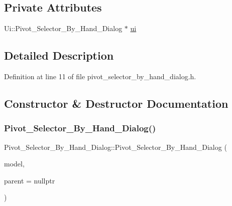 \subsection*{Private Attributes}
\begin{DoxyCompactItemize}
\item 
Ui\+::\+Pivot\+\_\+\+Selector\+\_\+\+By\+\_\+\+Hand\+\_\+\+Dialog $\ast$ \hyperlink{classPivot__Selector__By__Hand__Dialog_a0d5f15b127863ddef68e1427bc8be59e}{ui}
\end{DoxyCompactItemize}


\subsection{Detailed Description}


Definition at line 11 of file pivot\+\_\+selector\+\_\+by\+\_\+hand\+\_\+dialog.\+h.



\subsection{Constructor \& Destructor Documentation}
\mbox{\label{classPivot__Selector__By__Hand__Dialog_a3bcba85b301015f7c386bf88fc5ae133}} 
\subsubsection{\texorpdfstring{Pivot\+\_\+\+Selector\+\_\+\+By\+\_\+\+Hand\+\_\+\+Dialog()}{Pivot\_Selector\_By\_Hand\_Dialog()}}
{\footnotesize\ttfamily Pivot\+\_\+\+Selector\+\_\+\+By\+\_\+\+Hand\+\_\+\+Dialog\+::\+Pivot\+\_\+\+Selector\+\_\+\+By\+\_\+\+Hand\+\_\+\+Dialog (\begin{DoxyParamCaption}\item[{Q\+Standard\+Item\+Model $\ast$}]{model,  }\item[{Q\+Widget $\ast$}]{parent = {\ttfamily nullptr} }\end{DoxyParamCaption})\hspace{0.3cm}{\ttfamily [explicit]}}




